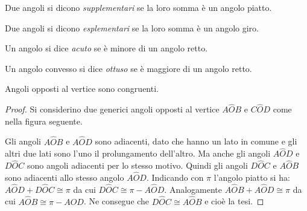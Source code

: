 \begin{definizione}
Due angoli si dicono \emph{supplementari} se la loro somma è un angolo piatto.
\end{definizione}

\begin{figure}[htb]
\centering
\end{figure}

\begin{definizione}
Due angoli si dicono \emph{esplementari} se la loro somma è un angolo giro.
\end{definizione}

\begin{figure}[htb]
\centering
\end{figure}

\begin{definizione}
Un angolo si dice \emph{acuto} se è minore di un angolo retto.
\end{definizione}

\begin{definizione}
Un angolo convesso si dice \emph{ottuso} se è maggiore di un angolo retto.
\end{definizione}

\begin{figure}[htb]
\centering
\end{figure}

\begin{teorema}
Angoli opposti al vertice sono congruenti.
\end{teorema}

\begin{proof}
Si considerino due generici angoli opposti al vertice $A\widehat{O}B$ e $C\widehat{O}D$ come nella figura seguente.
\begin{figure}[htb]
\centering
\end{figure}
Gli angoli $A\widehat{O}B$ e $A\widehat{O}D$ sono adiacenti, dato che hanno un lato in comune e gli altri due lati sono l'uno il prolungamento dell'altro. Ma anche gli angoli $A\widehat{O}D$ e $D\widehat{O}C$ sono angoli adiacenti per lo stesso motivo. Quindi gli angoli $D\widehat{O}C$ e $A\widehat{O}B$ sono adiacenti allo stesso angolo $A\widehat{O}D$.
Indicando con $\pi$ l'angolo piatto si ha: $A\widehat{O}D + D\widehat{O}C \cong \pi$ da cui $D\widehat{O}C\cong \pi - A\widehat{O}D$. Analogamente $A\widehat{O}B+A\widehat{O}D\cong\pi$ da cui $A\widehat{O}B\cong \pi-A\widehat{O}D$. Ne consegue che $D\widehat{O}C\cong A\widehat{O}B$ e cioè la tesi.
\end{proof}

